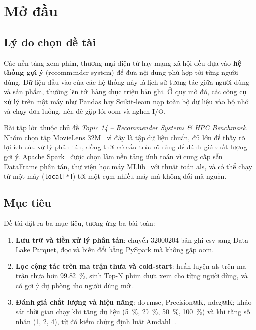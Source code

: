 \chapter{Mở đầu}
\label{chap:mo_dau}

\section{Lý do chọn đề tài}
\label{sec:ly_do}
Các nền tảng xem phim, thương mại điện tử hay mạng xã hội đều dựa vào \textbf{hệ thống gợi ý} (recommender system) để đưa nội dung phù hợp tới từng người dùng. Dữ liệu đầu vào của các hệ thống này là lịch sử tương tác giữa người dùng và sản phẩm, thường lên tới hàng chục triệu bản ghi. Ở quy mô đó, các công cụ xử lý trên một máy như Pandas hay Scikit-learn nạp toàn bộ dữ liệu vào bộ nhớ và chạy đơn luồng, nên dễ gặp lỗi \gls{oom} và nghẽn I/O.

Bài tập lớn thuộc chủ đề \emph{Topic 14 -- Recommender Systems \& HPC Benchmark}. Nhóm chọn tập MovieLens 32M~\cite{grouplens32m,harper2015movielens} vì đây là tập dữ liệu chuẩn, đủ lớn để thấy rõ lợi ích của xử lý phân tán, đồng thời có cấu trúc rõ ràng để đánh giá chất lượng gợi ý. Apache Spark~\cite{zaharia2012rdd} được chọn làm nền tảng tính toán vì cung cấp sẵn DataFrame phân tán, thư viện học máy MLlib~\cite{meng2016mllib} với thuật toán \gls{als}, và có thể chạy từ một máy (\texttt{local[*]}) tới một cụm nhiều máy mà không đổi mã nguồn.

\section{Mục tiêu}
\label{sec:muc_tieu}
Đề tài đặt ra ba mục tiêu, tương ứng ba bài toán:
\begin{enumerate}
    \item \textbf{Lưu trữ và tiền xử lý phân tán}: chuyển \num{32000204} bản ghi \gls{csv} sang Data Lake Parquet, đọc và biến đổi bằng PySpark mà không gặp \gls{oom}.
    \item \textbf{Lọc cộng tác trên ma trận thưa và cold-start}: huấn luyện \gls{als} trên ma trận thưa hơn \SI{99,82}{\percent}, sinh Top-N phim chưa xem cho từng người dùng, và có gợi ý dự phòng cho người dùng mới.
    \item \textbf{Đánh giá chất lượng và hiệu năng}: đo \gls{rmse}, Precision@K, \gls{ndcg}@K; khảo sát thời gian chạy khi tăng dữ liệu (\SI{5}{\percent}, \SI{20}{\percent}, \SI{50}{\percent}, \SI{100}{\percent}) và khi tăng số nhân (1, 2, 4), từ đó kiểm chứng định luật Amdahl~\cite{amdahl1967}.
\end{enumerate}

